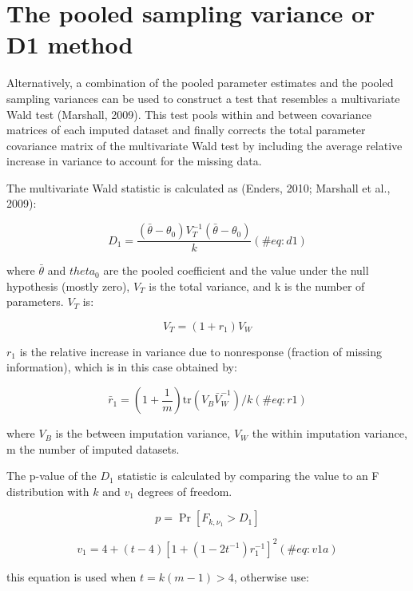 \documentclass[
]{book}
\begin{document}
\hypertarget{the-pooled-sampling-variance-or-d1-method}{%
\section{The pooled sampling variance or D1
method}\label{the-pooled-sampling-variance-or-d1-method}}

Alternatively, a combination of the pooled parameter estimates and the
pooled sampling variances can be used to construct a test that resembles
a multivariate Wald test (Marshall, 2009). This test pools within and
between covariance matrices of each imputed dataset and finally corrects
the total parameter covariance matrix of the multivariate Wald test by
including the average relative increase in variance to account for the
missing data.

The multivariate Wald statistic is calculated as (Enders, 2010; Marshall
et al., 2009):

\begin{equation}
  D_1 = \frac{ (\bar\theta - \theta_0)V_T^{-1} (\bar\theta - \theta_0) } {k}
  (\#eq:d1)
\end{equation}

where \(\bar\theta\) and \(theta_0\) are the pooled coefficient and the
value under the null hypothesis (mostly zero), \(V_T\) is the total
variance, and k is the number of parameters. \(V_T\) is:

\[V_T = (1+r_{1})V_W\]

\(r_1\) is the relative increase in variance due to nonresponse
(fraction of missing information), which is in this case obtained by:

\begin{equation}
\bar r_1 = \left(1+\frac{1}{m}\right)\mathrm{tr}(V_B\bar V_W^{-1})/k
(\#eq:r1)
\end{equation}

where \(V_B\) is the between imputation variance, \(V_W\) the within
imputation variance, m the number of imputed datasets.

The p-value of the \(D_1\) statistic is calculated by comparing the
value to an F distribution with \(k\) and \(v_1\) degrees of freedom.

\[p = \Pr[F_{k,\nu_1}>D_1]\]

\begin{equation}
v_1 = 4 + (t-4)[1+(1-2t^{-1})r_1^{-1}]^2
(\#eq:v1a)
\end{equation}

this equation is used when \(t = k(m-1) > 4\), otherwise use:
\end{document}
